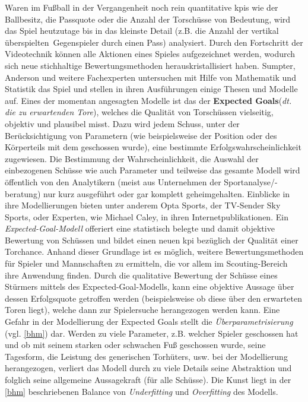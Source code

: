 Waren im Fußball in der Vergangenheit noch rein quantitative \glspl{kpi} wie der Ballbesitz, die Passquote oder die Anzahl der Torschüsse von Bedeutung, wird das Spiel heutzutage bis in das kleinste Detail (z.B. die Anzahl der vertikal \glqq überspielten\grqq~Gegenspieler durch einen Pass) analysiert. Durch den Fortschritt der Videotechnik können alle Aktionen eines Spieles aufgezeichnet werden, wodurch sich neue stichhaltige Bewertungsmethoden herauskristallisiert haben. Sumpter, Anderson und weitere Fachexperten untersuchen mit Hilfe von Mathematik und Statistik das Spiel und stellen in ihren Ausführungen einige Thesen und Modelle auf. Eines der momentan angesagten Modelle ist das der \glqq \textbf{Expected Goals}\grqq (\textit{dt. die zu erwartenden Tore}), welches die Qualität von Torschüssen vielseitig, objektiv und plausibel misst. Dazu wird jedem Schuss, unter der Berücksichtigung von Parametern (wie beispielsweise der Position oder des Körperteils mit dem geschossen wurde), eine bestimmte Erfolgswahrscheinlichkeit zugewiesen. Die Bestimmung der Wahrscheinlichkeit, die Auswahl der einbezogenen Schüsse wie auch Parameter und teilweise das gesamte Modell wird öffentlich von den Analytikern (meist aus Unternehmen der Sportanalyse/-beratung) nur kurz ausgeführt oder gar komplett geheimgehalten. Einblicke in ihre Modellierungen bieten unter anderem Opta Sports, der TV-Sender Sky Sports, oder Experten, wie Michael Caley, in ihren Internetpublikationen. Ein \textit{Expected-Goal-Modell} offeriert eine statistisch belegte und damit objektive Bewertung von Schüssen und bildet einen neuen \gls{kpi} bezüglich der Qualität einer Torchance. Anhand dieser Grundlage ist es möglich, weitere Bewertungsmethoden für Spieler und Mannschaften zu ermitteln, die vor allem im Scouting-Bereich ihre Anwendung finden. Durch die qualitative Bewertung der Schüsse eines Stürmers mittels des Expected-Goal-Modells, kann eine objektive Aussage über dessen Erfolgsquote getroffen werden (beispielsweise ob diese über den erwarteten Toren liegt), welche dann zur Spielersuche herangezogen werden kann. Eine Gefahr in der Modellierung der Expected Goals stellt die \textit{Überparametrisierung} (vgl. \vref{bhm}) dar. Werden zu viele Parameter, z.B. welcher Spieler geschossen hat und ob mit seinem starken oder schwachen Fuß geschossen wurde, seine Tagesform, die Leistung des generischen Torhüters, usw. bei der Modellierung herangezogen, verliert das Modell durch zu viele Details seine Abstraktion und folglich seine allgemeine Aussagekraft (für alle Schüsse). Die Kunst liegt in der \vref{bhm} beschriebenen Balance von \textit{Underfitting} und \textit{Overfitting} des Modells.

